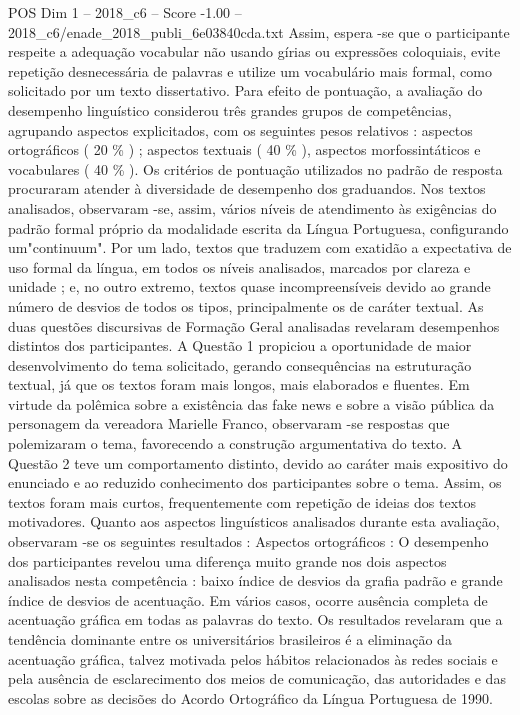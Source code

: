 \begin{textsample}{POS Dim 1 – 2018\_c6 – Score -1.00 – 2018\_c6/enade\_2018\_publi\_6e03840cda.txt}
Assim, espera -se que o participante respeite a adequação vocabular não usando gírias ou expressões coloquiais, evite repetição desnecessária de palavras e utilize um vocabulário mais formal, como solicitado por um texto dissertativo.
Para efeito de pontuação, a avaliação do desempenho linguístico considerou três grandes grupos de competências, agrupando aspectos explicitados, com os seguintes pesos relativos : aspectos ortográficos ( 20 \% ) ; aspectos textuais ( 40 \% ), aspectos morfossintáticos e vocabulares ( 40 \% ).
Os critérios de pontuação utilizados no padrão de resposta procuraram atender à diversidade de desempenho dos graduandos.
Nos textos analisados, observaram -se, assim, vários níveis de atendimento às exigências do padrão formal próprio da modalidade escrita da Língua Portuguesa, configurando um"continuum".
Por um lado, textos que traduzem com exatidão a expectativa de uso formal da língua, em todos os níveis analisados, marcados por clareza e unidade ; e, no outro extremo, textos quase incompreensíveis devido ao grande número de desvios de todos os tipos, principalmente os de caráter textual.
As duas questões discursivas de Formação Geral analisadas revelaram desempenhos distintos dos participantes.
A Questão 1 propiciou a oportunidade de maior desenvolvimento do tema solicitado, gerando consequências na estruturação textual, já que os textos foram mais longos, mais elaborados e fluentes.
Em virtude da polêmica sobre a existência das fake news e sobre a visão pública da personagem da vereadora Marielle Franco, observaram -se respostas que polemizaram o tema, favorecendo a construção argumentativa do texto.
A Questão 2 teve um comportamento distinto, devido ao caráter mais expositivo do enunciado e ao reduzido conhecimento dos participantes sobre o tema.
Assim, os textos foram mais curtos, frequentemente com repetição de ideias dos textos motivadores.
Quanto aos aspectos linguísticos analisados durante esta avaliação, observaram -se os seguintes resultados : Aspectos ortográficos : O desempenho dos participantes revelou uma diferença muito grande nos dois aspectos analisados nesta competência : baixo índice de desvios da grafia padrão e grande índice de desvios de acentuação.
Em vários casos, ocorre ausência completa de acentuação gráfica em todas as palavras do texto.
Os resultados revelaram que a tendência dominante entre os universitários brasileiros é a eliminação da acentuação gráfica, talvez motivada pelos hábitos relacionados às redes sociais e pela ausência de esclarecimento dos meios de comunicação, das autoridades e das escolas sobre as decisões do Acordo Ortográfico da Língua Portuguesa de 1990.

\end{textsample}

